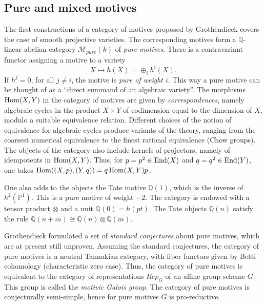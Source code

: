 \documentclass[10pt]{amsart}
\renewcommand{\P}{{\mathbb P}}
\def\Q{{\mathbb Q}}
\def\cM{{\mathcal M}}
\def\End{\mathop{\rm End}\nolimits}
\def\Hom{\mathop{\rm Hom}\nolimits}
\numberwithin{equation}{section}
\begin{document}
\medskip
\subsection*{Pure and mixed motives}\hfill\medskip

The first constructions of a category of motives proposed by
Grothendieck covers the case of
smooth projective varieties. The corresponding motives form a
$\Q$-linear abelian category $\cM_{pure}(k)$ of {\em pure motives}.
There is a contravariant functor assigning a
motive to a variety
\begin{equation}\label{hX}
 X \mapsto h(X)=\oplus_i h^i(X).
\end{equation}
If $h^j=0$, for all $j\neq i$, the motive is {\em pure of weight $i$}.
This way a pure motive can be thought of as a ``direct summand of
an algebraic variety''. The morphisms $\Hom(X,Y)$ in the category of
motives are given by {\em correspondences}, namely algebraic cycles in
the product $X\times Y$ of codimension equal to the dimension of $X$,
modulo a suitable equivalence relation. Different
choices of the notion of equivalence for algebraic cycles produce
variants of the theory, ranging from the coarsest numerical
equivalence to the finest rational equivalence (Chow groups).
The objects of the category also include kernels of projectors,
namely of idempotents in $\Hom(X,Y)$. Thus, for $p=p^2\in \End(X)$ and
$q=q^2\in \End(Y)$, one takes $\Hom((X,p),(Y,q))=q \Hom(X,Y) p$.

\smallskip

One also adds to the objects the Tate motive
$\Q(1)$, which is the inverse of $h^2(\P^1)$. This is a pure motive of
weight $-2$. The category is endowed with a tensor product $\otimes$
and a unit $\Q(0)=h(pt)$. The Tate objects $\Q(n)$ satisfy the rule
$\Q(n+m)\cong \Q(n)\otimes \Q(m)$.

\smallskip

Grothendieck formulated a set of {\em standard conjectures} about pure
motives, which are at present still unproven. Assuming the standard
conjectures, the category of pure motives is a neutral Tannakian
category, with fiber functors given by Betti cohomology
(characteristic zero case). Thus, the category of pure motives is
equivalent to the category of representations $Rep_G$ of an affine
group scheme $G$. This group is called the {\em motivic Galois
group}. The category of pure motives is conjecturally semi-simple,
hence for pure motives $G$ is pro-reductive.

\smallskip
\end{document}
